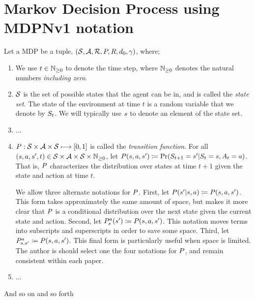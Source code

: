 \documentclass[a4paper]{article}
\begin{document}
\section{Markov Decision Process using MDPNv1 notation}
\label{sec:mdps}
Let a \gls{MDP} be a tuple, $\MDP$, where;
%
\begin{enumerate}
    \item We use $\TimeStep$ to denote the time step, where $\NZ$ denotes the natural numbers {\em including zero}.

    \item $\StateSpace$ is the set of possible states that the agent can be in, and is called the {\em state set}. The state of the environment at time $t$ is a random variable that we denote by $\StateT{t}$. We will typically use $\State$ to denote an element of the state set.

    \item ...

    \item $\TransitionFunctionFull$ is called the {\em transition function}. For all $(s,a,s',t) \in \StateSpace \times \ActionSpace \times \StateSpace \times \NZ$, let $\TransitionFunction(s,a,s')\coloneqq\Pr(\StateT{t+1}=s' | \StateT{t}=s, \ActionT{t}=a)$.
    That is, $\TransitionFunction$ characterizes the distribution over states at time $t+1$ given the state and action at time $t$.

    We allow three alternate notations for $\TransitionFunction$.
    First, let $\TransitionA{s}{a}{s'} \coloneqq \TransitionFunction(s,a,s')$.
    This form takes approximately the same amount of space, but makes it more clear that $\TransitionFunction$ is a conditional distribution over the next state given the current state and action.
    Second, let $\TransitionB{s}{a}{s'} \coloneqq \TransitionFunction(s,a,s')$.
    This notation moves terms into subscripts and superscripts in order to save some space.
    Third, let $\TransitionC{s}{a}{s'} \coloneqq \TransitionFunction(s,a,s')$.
    This final form is particularly useful when space is limited.
    The author is should select one the four notations for $\TransitionFunction$, and remain consistent within each paper.

    \item ...

\end{enumerate}
%
And so on and so forth




\end{document}
